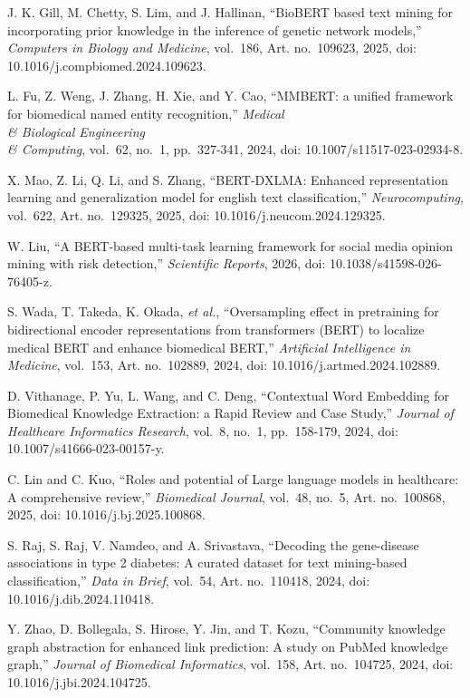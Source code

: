  J. K. Gill, M. Chetty, S. Lim, and J. Hallinan, ``BioBERT based text mining for incorporating prior knowledge in the inference of genetic network models,'' \textit{Computers in Biology and Medicine}, vol.~186, Art. no.~109623, 2025, doi: 10.1016/j.compbiomed.2024.109623.

 L. Fu, Z. Weng, J. Zhang, H. Xie, and Y. Cao, ``MMBERT: a unified framework for biomedical named entity recognition,'' \textit{Medical \\& Biological Engineering \\& Computing}, vol.~62, no.~1, pp.~327-341, 2024, doi: 10.1007/s11517-023-02934-8.

 X. Mao, Z. Li, Q. Li, and S. Zhang, ``BERT-DXLMA: Enhanced representation learning and generalization model for english text classification,'' \textit{Neurocomputing}, vol.~622, Art. no.~129325, 2025, doi: 10.1016/j.neucom.2024.129325.

 W. Liu, ``A BERT-based multi-task learning framework for social media opinion mining with risk detection,'' \textit{Scientific Reports}, 2026, doi: 10.1038/s41598-026-76405-z.

 S. Wada, T. Takeda, K. Okada, \textit{et al.}, ``Oversampling effect in pretraining for bidirectional encoder representations from transformers (BERT) to localize medical BERT and enhance biomedical BERT,'' \textit{Artificial Intelligence in Medicine}, vol.~153, Art. no.~102889, 2024, doi: 10.1016/j.artmed.2024.102889.

 D. Vithanage, P. Yu, L. Wang, and C. Deng, ``Contextual Word Embedding for Biomedical Knowledge Extraction: a Rapid Review and Case Study,'' \textit{Journal of Healthcare Informatics Research}, vol.~8, no.~1, pp.~158-179, 2024, doi: 10.1007/s41666-023-00157-y.

 C. Lin and C. Kuo, ``Roles and potential of Large language models in healthcare: A comprehensive review,'' \textit{Biomedical Journal}, vol.~48, no.~5, Art. no.~100868, 2025, doi: 10.1016/j.bj.2025.100868.

 S. Raj, S. Raj, V. Namdeo, and A. Srivastava, ``Decoding the gene-disease associations in type 2 diabetes: A curated dataset for text mining-based classification,'' \textit{Data in Brief}, vol.~54, Art. no.~110418, 2024, doi: 10.1016/j.dib.2024.110418.

 Y. Zhao, D. Bollegala, S. Hirose, Y. Jin, and T. Kozu, ``Community knowledge graph abstraction for enhanced link prediction: A study on PubMed knowledge graph,'' \textit{Journal of Biomedical Informatics}, vol.~158, Art. no.~104725, 2024, doi: 10.1016/j.jbi.2024.104725.

